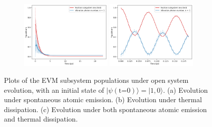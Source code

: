 \documentclass[11pt]{article}
\begin{document}
\begin{figure}[H]
    \vspace{0.8em}

    \begin{subfigure}{\textwidth}
        \centering
        \includegraphics[width=0.49\textwidth]{Research Project/Code/results/ExVib/Open/Population/Envelope/pops_ex_both_e0.png}
        \hfill
        \includegraphics[width=0.49\textwidth]{Research Project/Code/results/ExVib/Open/Population/Fast/pops_ex_both_e0.png}
        \caption{}
        \label{fig:EVM_OQS_Pop_both_e0}
    \end{subfigure}
    \caption{Plots of the EVM subsystem populations under open system evolution, with an initial state of $|\psi (\text{t=0})\rangle = |1, 0\rangle$. (a) Evolution under spontaneous atomic emission. (b) Evolution under thermal dissipation. (c) Evolution under both spontaneous atomic emission and thermal dissipation.}
    \label{fig:EVM_OQS_Pop}
\end{figure}
\end{document}
